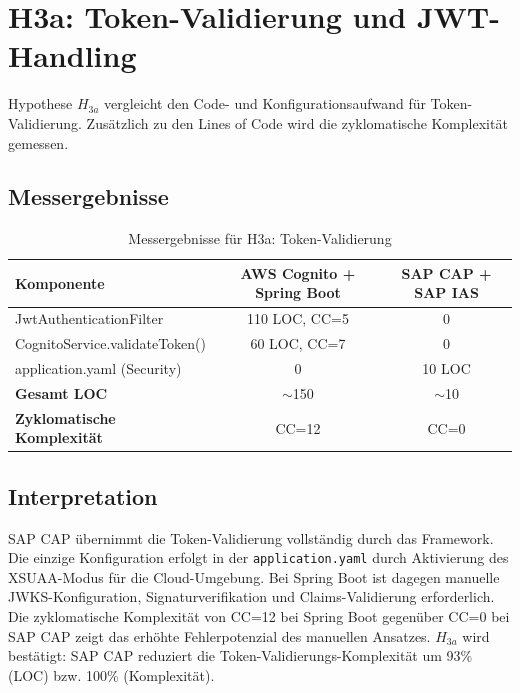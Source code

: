 \section{H3a: Token-Validierung und JWT-Handling}

Hypothese $H_{3a}$ vergleicht den Code- und Konfigurationsaufwand für
Token-Validierung. Zusätzlich zu den Lines of Code wird die zyklomatische
Komplexität gemessen.

\subsection{Messergebnisse}

\begin{table}[h]
    \centering
    \begin{tabular}{|l|c|c|}
        \hline
        \textbf{Komponente} & \textbf{AWS Cognito + Spring Boot}  & \textbf{SAP CAP + SAP IAS}  \\
        \hline
        JwtAuthenticationFilter & 110 LOC, CC=5 & 0 \\
        \hline
        CognitoService.validateToken()  & 60 LOC, CC=7  & 0 \\
        \hline
        application.yaml (Security) & 0 & 10 LOC  \\
        \hline
        \textbf{Gesamt LOC} & $\sim$150 & $\sim$10  \\
        \hline
        \textbf{Zyklomatische Komplexität}  & CC=12 & CC=0  \\
        \hline
    \end{tabular}
    \caption{Messergebnisse für H3a: Token-Validierung}
    \label{tab:h3a_ergebnisse}
\end{table}

\subsection{Interpretation}

\ac{SAP CAP} übernimmt die Token-Validierung vollständig durch das Framework. Die einzige Konfiguration erfolgt in der \texttt{application.yaml} durch Aktivierung des XSUAA-Modus für die Cloud-Umgebung. Bei Spring Boot ist dagegen manuelle JWKS-Konfiguration, Signaturverifikation und Claims-Validierung erforderlich. Die zyklomatische Komplexität von CC=12 bei Spring Boot gegenüber CC=0 bei \ac{SAP CAP} zeigt das erhöhte Fehlerpotenzial des manuellen Ansatzes. $H_{3a}$ wird bestätigt: \ac{SAP CAP} reduziert die Token-Validierungs-Komplexität um 93\% (LOC) bzw. 100\% (Komplexität).


